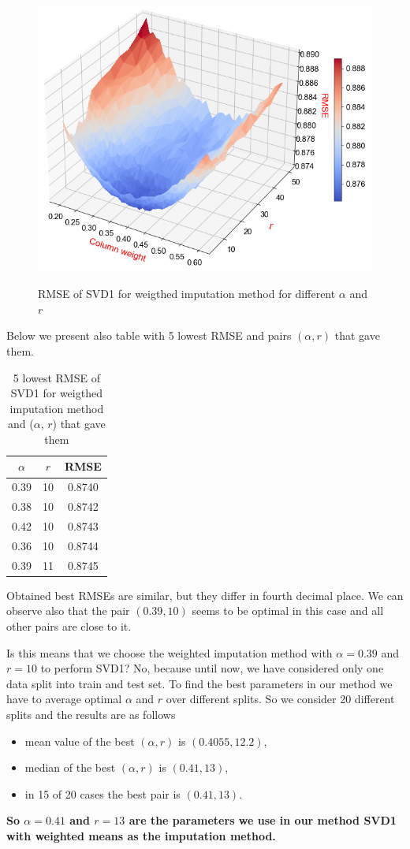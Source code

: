 \documentclass[10pt]{amsart}
\begin{document}
\begin{figure}[H]
\includegraphics[scale=0.54]{fig/svd1_r_w2}
\label{fig:figure}
\caption{RMSE of SVD1 for weigthed imputation method for different $\alpha$ and $r$}
\end{figure}

Below we present also table with 5 lowest RMSE and pairs $(\alpha, r)$ that gave them.
\begin{table}[H]
\begin{tabular}{cc|c}
 $\alpha$ &  $r$ &     RMSE \\
\hline
       0.39 & 10 & 0.8740 \\
       0.38 & 10 & 0.8742 \\
       0.42 & 10 & 0.8743 \\
       0.36 & 10 & 0.8744 \\
       0.39 & 11 & 0.8745 \\
\end{tabular}
\caption{5 lowest RMSE of SVD1 for weigthed imputation method and ($\alpha$, $r$) that gave them}
\end{table}
Obtained best RMSEs are similar, but they differ in fourth decimal place.
We can observe also that the pair $(0.39, 10)$ seems to be optimal in this case and all other pairs are close to it.


Is this means that we choose the weighted imputation method with $\alpha = 0.39$ and $r=10$ to perform SVD1?
No, because until now, we have considered only one data split into train and test set.
To find the best parameters in our method we have to average optimal $\alpha$ and $r$ over different splits.
So we consider 20 different splits and the results are as follows
\begin{itemize}
    \item mean value of the best $(\alpha, r)$ is $(0.4055, 12.2)$,
    \item median of the best $(\alpha, r)$ is $(0.41, 13)$,
    \item in 15 of 20 cases the best pair is $(0.41, 13)$.
\end{itemize}
\textbf{So $\alpha = 0.41$ and $r = 13$ are the parameters we use in our method SVD1 with weighted means as the imputation method.}
\end{document}
